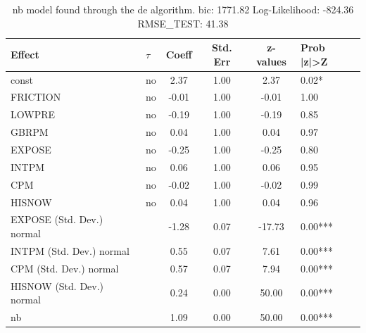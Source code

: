 \begin{table}
	\caption{nb model found through the de algorithm. bic: 1771.82 Log-Likelihood: -824.36 RMSE_TEST: 41.38}
	\begin{center}
		\begin{tabular}{|l|l|c|c|c|l|}
			\hline
			Effect & $\tau$ & Coeff & Std. Err & z-values & Prob |z|>Z \\
			\hline
			const & no & 2.37 & 1.00 & 2.37 & 0.02* \\
			\hline
			FRICTION & no & -0.01 & 1.00 & -0.01 & 1.00 \\
			\hline
			LOWPRE & no & -0.19 & 1.00 & -0.19 & 0.85 \\
			\hline
			GBRPM & no & 0.04 & 1.00 & 0.04 & 0.97 \\
			\hline
			EXPOSE & no & -0.25 & 1.00 & -0.25 & 0.80 \\
			\hline
			INTPM & no & 0.06 & 1.00 & 0.06 & 0.95 \\
			\hline
			CPM & no & -0.02 & 1.00 & -0.02 & 0.99 \\
			\hline
			HISNOW & no & 0.04 & 1.00 & 0.04 & 0.96 \\
			\hline
			EXPOSE (Std. Dev.) normal &  & -1.28 & 0.07 & -17.73 & 0.00*** \\
			\hline
			INTPM (Std. Dev.) normal &  & 0.55 & 0.07 & 7.61 & 0.00*** \\
			\hline
			CPM (Std. Dev.) normal &  & 0.57 & 0.07 & 7.94 & 0.00*** \\
			\hline
			HISNOW (Std. Dev.) normal &  & 0.24 & 0.00 & 50.00 & 0.00*** \\
			\hline
			nb &  & 1.09 & 0.00 & 50.00 & 0.00*** \\
			\hline
		\end{tabular}
	\end{center}
\end{table}